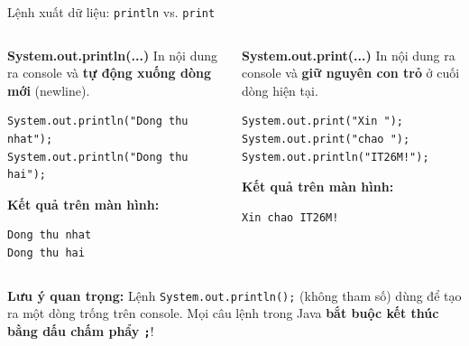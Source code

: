 \documentclass[aspectratio=169, 10pt]{beamer}
\begin{document}
\begin{frame}[fragile]{Lệnh xuất dữ liệu: \texttt{println} vs. \texttt{print}}
  \begin{columns}[t]
    \begin{block}{\textbf{System.out.println(...)}}
      In nội dung ra console và \textbf{tự động xuống dòng mới} (newline).
      \begin{lstlisting}
System.out.println("Dong thu nhat");
System.out.println("Dong thu hai");
      \end{lstlisting}
      \textbf{Kết quả trên màn hình:}
      \begin{lstlisting}[style=terminalStyle]
Dong thu nhat
Dong thu hai
      \end{lstlisting}
    \end{block}

    \begin{block}{\textbf{System.out.print(...)}}
      In nội dung ra console và \textbf{giữ nguyên con trỏ} ở cuối dòng hiện tại.
      \begin{lstlisting}
System.out.print("Xin ");
System.out.print("chao ");
System.out.println("IT26M!");
      \end{lstlisting}
      \textbf{Kết quả trên màn hình:}
      \begin{lstlisting}[style=terminalStyle]
Xin chao IT26M!
      \end{lstlisting}
    \end{block}
  \end{columns}

  \vspace{2mm}
  \begin{alertblock}{\textbf{Lưu ý quan trọng:}}
    Lệnh \texttt{System.out.println();} (không tham số) dùng để tạo ra một dòng trống trên console. Mọi câu lệnh trong Java \textbf{bắt buộc kết thúc bằng dấu chấm phẩy \texttt{;}}!
  \end{alertblock}
\end{frame}
\end{document}
